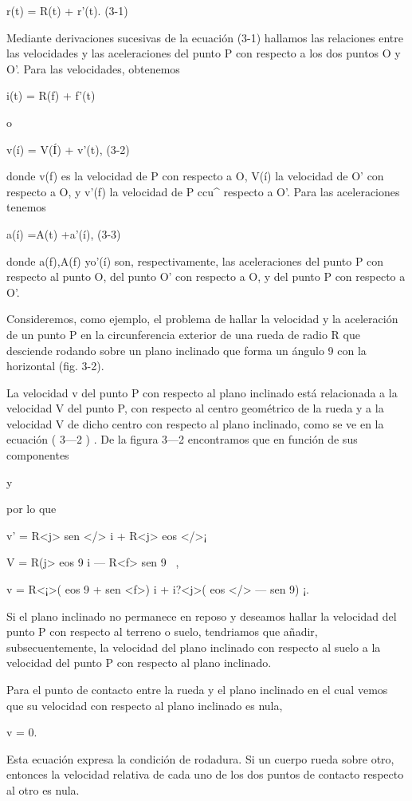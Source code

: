 r(t) = R(t) + r'(t). (3-1) 

Mediante derivaciones sucesivas de la ecuación (3-1) hallamos las relaciones entre las velocidades y las aceleraciones del punto P con respecto a los dos puntos O y O'. Para las velocidades, obtenemos 

i(t) = R(f) + f'(t) 

o 

v(í) = V(Í) + v'(t), (3-2) 

donde v(f) es la velocidad de P con respecto a O, V(í) la velocidad de O’ con respecto a O, y v'(f) la velocidad de P ccu^ respecto a O'. Para las aceleraciones tenemos 

a(í) =A(t) +a'(í), (3-3) 

donde a(f),A(f) yo'(í) son, respectivamente, las aceleraciones del punto P con respecto al punto O, del punto O' con respecto a O, y del punto P con respecto a O'. 

Consideremos, como ejemplo, el problema de hallar la velocidad y la aceleración de un punto P en la circunferencia exterior de una rueda de radio R que desciende rodando sobre un plano inclinado que forma 
un ángulo 9 con la horizontal (fig. 3-2). 

La velocidad v del punto P con respecto al plano inclinado está relacionada a la velocidad V del punto P, con respecto al centro geométrico de la rueda y a la velocidad V de dicho centro con respecto al plano inclinado, como se ve en la ecuación ( 3—2 ) . De la figura 3—2 encontramos que en función de sus componentes 

y 

por lo que 

v' = R<j> sen </> i + R<j> eos </>¡ 

V = R(j> eos 9 i — R<f> sen 9 \ , 

v = R<¡>( eos 9 + sen <f>) i + i?<j>( eos </> — sen 9) ¡. 

Si el plano inclinado no permanece en reposo y deseamos hallar la velocidad del punto P con respecto al terreno o suelo, tendriamos que añadir, subsecuentemente, la velocidad del plano inclinado con respecto al suelo a la velocidad del punto P con respecto al plano inclinado. 

Para el punto de contacto entre la rueda y el plano inclinado en el cual vemos que su velocidad con respecto al plano inclinado es nula, 

v = 0. 

Esta ecuación expresa la condición de rodadura. Si un cuerpo rueda sobre otro, entonces la velocidad relativa de cada uno de los dos puntos de contacto respecto al otro es nula. 

